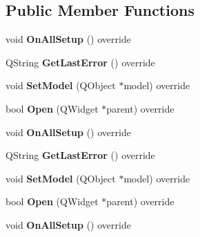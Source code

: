 \subsection*{Public Member Functions}
\begin{DoxyCompactItemize}
\item 
void {\bfseries On\+All\+Setup} () override\hypertarget{class_task_list_view_a8d3b2873b6d944aa2a0146a1b855e4ae}{}\label{class_task_list_view_a8d3b2873b6d944aa2a0146a1b855e4ae}

\item 
Q\+String {\bfseries Get\+Last\+Error} () override\hypertarget{class_task_list_view_af853529bf8207791465cb624c51f4850}{}\label{class_task_list_view_af853529bf8207791465cb624c51f4850}

\item 
void {\bfseries Set\+Model} (Q\+Object $\ast$model) override\hypertarget{class_task_list_view_a4f0f460ebfe6cef171b0434047ea9df3}{}\label{class_task_list_view_a4f0f460ebfe6cef171b0434047ea9df3}

\item 
bool {\bfseries Open} (Q\+Widget $\ast$parent) override\hypertarget{class_task_list_view_ac621ebd978d94c696aa0636560c4ea39}{}\label{class_task_list_view_ac621ebd978d94c696aa0636560c4ea39}

\item 
void {\bfseries On\+All\+Setup} () override\hypertarget{class_task_list_view_a8d3b2873b6d944aa2a0146a1b855e4ae}{}\label{class_task_list_view_a8d3b2873b6d944aa2a0146a1b855e4ae}

\item 
Q\+String {\bfseries Get\+Last\+Error} () override\hypertarget{class_task_list_view_af853529bf8207791465cb624c51f4850}{}\label{class_task_list_view_af853529bf8207791465cb624c51f4850}

\item 
void {\bfseries Set\+Model} (Q\+Object $\ast$model) override\hypertarget{class_task_list_view_a4f0f460ebfe6cef171b0434047ea9df3}{}\label{class_task_list_view_a4f0f460ebfe6cef171b0434047ea9df3}

\item 
bool {\bfseries Open} (Q\+Widget $\ast$parent) override\hypertarget{class_task_list_view_ac621ebd978d94c696aa0636560c4ea39}{}\label{class_task_list_view_ac621ebd978d94c696aa0636560c4ea39}

\item 
void {\bfseries On\+All\+Setup} () override\hypertarget{class_task_list_view_a8d3b2873b6d944aa2a0146a1b855e4ae}{}\label{class_task_list_view_a8d3b2873b6d944aa2a0146a1b855e4ae}


\end{DoxyCompactItemize}

